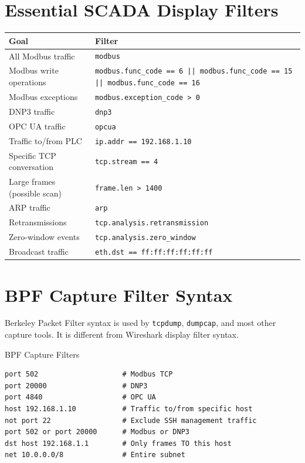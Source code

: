 \documentclass[12pt,twoside,openright]{memoir}
\newcommand{\filter}[1]{\texttt{\color{wsblue}#1}}
\begin{document}
\section{Essential SCADA Display Filters}

\begin{filterbox}
\begin{center}
\begin{tabular}{L{5.5cm}L{6cm}}
\toprule
\textbf{Goal} & \textbf{Filter} \\
\midrule
All Modbus traffic & \filter{modbus} \\
Modbus write operations & \filter{modbus.func\_code == 6 || modbus.func\_code == 15 || modbus.func\_code == 16} \\
Modbus exceptions & \filter{modbus.exception\_code > 0} \\
DNP3 traffic & \filter{dnp3} \\
OPC UA traffic & \filter{opcua} \\
Traffic to/from PLC & \filter{ip.addr == 192.168.1.10} \\
Specific TCP conversation & \filter{tcp.stream == 4} \\
Large frames (possible scan) & \filter{frame.len > 1400} \\
ARP traffic & \filter{arp} \\
Retransmissions & \filter{tcp.analysis.retransmission} \\
Zero-window events & \filter{tcp.analysis.zero\_window} \\
Broadcast traffic & \filter{eth.dst == ff:ff:ff:ff:ff:ff} \\
\bottomrule
\end{tabular}
\end{center}
\end{filterbox}

\section{BPF Capture Filter Syntax}

Berkeley Packet Filter syntax is used by \texttt{tcpdump}, \texttt{dumpcap}, and most other capture tools. It is different from Wireshark display filter syntax.

\begin{example}{BPF Capture Filters}
\begin{lstlisting}
port 502                    # Modbus TCP
port 20000                  # DNP3
port 4840                   # OPC UA
host 192.168.1.10           # Traffic to/from specific host
not port 22                 # Exclude SSH management traffic
port 502 or port 20000      # Modbus or DNP3
dst host 192.168.1.1        # Only frames TO this host
net 10.0.0.0/8              # Entire subnet
\end{lstlisting}
\end{example}
\end{document}
